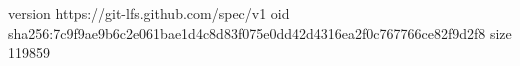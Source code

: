 version https://git-lfs.github.com/spec/v1
oid sha256:7c9f9ae9b6c2e061bae1d4c8d83f075e0dd42d4316ea2f0c767766ce82f9d2f8
size 119859

